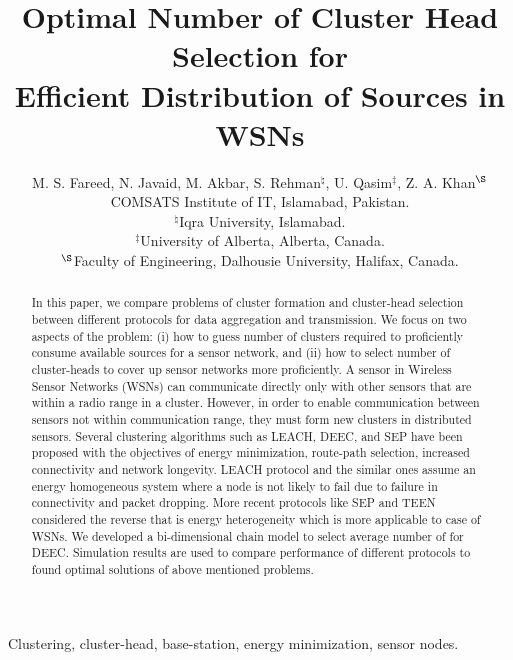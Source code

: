 \documentclass[10pt, conference, compsocconf]{IEEEtran}
\begin{document}
\title{Optimal Number of Cluster Head Selection for\\ Efficient Distribution of Sources in WSNs}

\author{M. S. Fareed, N. Javaid, M. Akbar, S. Rehman$^{\natural}$, U. Qasim$^{\ddag}$, Z. A. Khan$^{\S}$\\

        COMSATS Institute of IT, Islamabad, Pakistan.\\
        $^{\natural}$Iqra University, Islamabad.\\
        $^{\ddag}$University of Alberta, Alberta, Canada.\\
        $^{\S}$Faculty of Engineering, Dalhousie University, Halifax, Canada.
        }

\maketitle

\begin{abstract}
In this paper, we compare problems of cluster formation and cluster-head selection between different protocols for data aggregation and transmission. We focus on two aspects of the problem: (i) how to guess number of clusters required to proficiently consume available sources for a sensor network, and (ii) how to select number of cluster-heads to cover up sensor networks more proficiently. A sensor in Wireless Sensor Networks (WSNs) can communicate directly only with other sensors that are within a radio range in a cluster. However, in order to enable communication between sensors not within communication range, they must form new clusters in distributed sensors. Several clustering algorithms such as LEACH, DEEC, and SEP have been proposed with the objectives of energy minimization, route-path selection, increased connectivity and network longevity. LEACH protocol and the similar ones assume an energy homogeneous system where a node is not likely to fail due to failure in connectivity and packet dropping. More recent protocols like SEP and TEEN considered the reverse that is energy heterogeneity which is more applicable to case of WSNs. We developed a bi-dimensional chain model to select average number of  for DEEC. Simulation results are used to compare performance of different protocols to found optimal solutions of above mentioned problems.
\end{abstract}

\begin{IEEEkeywords}
Clustering, cluster-head, base-station, energy minimization, sensor nodes.
\end{IEEEkeywords}
\end{document}
